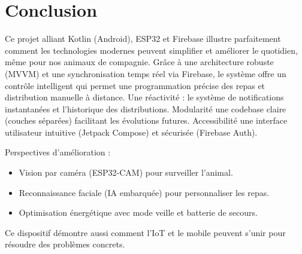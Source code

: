 \chapter*{Conclusion}

Ce projet alliant Kotlin (Android), ESP32 et Firebase illustre parfaitement comment les technologies modernes peuvent simplifier et améliorer le quotidien, même pour nos animaux de compagnie. Grâce à une architecture robuste (MVVM) et une synchronisation temps réel via Firebase, le système offre un contrôle intelligent qui permet une programmation précise des repas et distribution manuelle à distance. Une réactivité : le système de notifications instantanées et l'historique des distributions. Modularité une codebase claire (couches séparées) facilitant les évolutions futures. Accessibilité  une interface utilisateur intuitive (Jetpack Compose) et sécurisée (Firebase Auth).

Perspectives d’amélioration : 
\begin{itemize}

\item  Vision par caméra (ESP32-CAM) pour surveiller l’animal.

\item    Reconnaissance faciale (IA embarquée) pour personnaliser les repas.

\item    Optimisation énergétique avec mode veille et batterie de secours.
\end{itemize} 

Ce dispositif démontre aussi comment l’IoT et le mobile peuvent s’unir pour résoudre des problèmes concrets.
